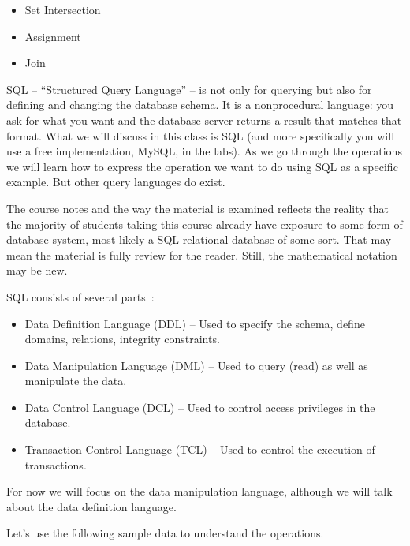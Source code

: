 \begin{itemize}
	\item Set Intersection
	\item Assignment
	\item Join
\end{itemize}

SQL -- ``Structured Query Language'' -- is not only for querying but also for defining and changing the database schema. It is a nonprocedural language: you ask for what you want and the database server returns a result that matches that format. What we will discuss in this class is SQL (and more specifically you will use a free implementation, MySQL, in the labs). As we go through the operations we will learn how to express the operation we want to do using SQL as a specific example. But other query languages do exist.

The course notes and the way the material is examined reflects the reality that the majority of students taking this course already have exposure to some form of database system, most likely a SQL relational database of some sort. That may mean the material is fully review for the reader. Still, the mathematical notation may be new.

SQL consists of several parts~\cite{dsc}:
\begin{itemize}
	\item Data Definition Language (DDL) -- Used to specify the schema, define domains, relations, integrity constraints.
	\item Data Manipulation Language (DML) -- Used to query (read) as well as manipulate the data.
	\item Data Control Language (DCL) -- Used to control access privileges in the database. 
	\item Transaction Control Language (TCL) -- Used to control the execution of transactions.
\end{itemize}

For now we will focus on the data manipulation language, although we will talk about the data definition language.

Let's use the following sample data to understand the operations.


